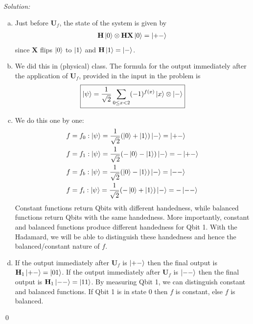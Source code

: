 \documentclass{book}
\theoremstyle{definition}
\newcommand{\nn}{\nonumber}
\newcommand{\X}{\mathbf{X}}
\newcommand{\f}[2]{\frac{#1}{#2}}
\newcommand{\U}{\mathbf{U}}
\newcommand{\had}{\mathbf{H}}
\begin{document}
\noindent \textit{Solution:}

\begin{enumerate}[(a)]
	\item Just before $\U_f$, the state of the system is given by
	\begin{align}
	\had \ket{ 0} \otimes \had \X \ket{0} = \ket{+-}
	\end{align}
	since $\X$ flips $\ket{0}$ to $\ket{1}$ and $\had\ket{1} = \ket{-}$. 
	
	
	\item We did this in (physical) class. The formula for the output immediately after the application of $\U_f$, provided in the input in the problem is  
	\begin{align}
	\boxed{\ket{\psi} = \f{1}{\sqrt{2}}  \sum_{0 \leq x < 2} (-1)^{f(x)}\ket{x} \otimes \ket{-}   }
	\end{align}
	
	
	\item We do this one by one:
	\begin{align}
	&f = f_{0}: \ket{ \psi } = \f{1}{\sqrt{2}} (\ket{0} + \ket{1})  \ket{-} = \ket{+-}\nn\\
	&f = f_{1}: \ket{ \psi } = \f{1}{\sqrt{2}} (-\ket{0} - \ket{1})  \ket{-} = -\ket{+-}\nn\\
	&f = f_{b}: \ket{ \psi } = \f{1}{\sqrt{2}} (\ket{0} - \ket{1})  \ket{-} = \ket{--}\nn\\
	&f = f_{i}: \ket{ \psi } = \f{1}{\sqrt{2}} (-\ket{0} + \ket{1})  \ket{-} = -\ket{--}
	\end{align}
	Constant functions return Qbits with different handedness, while balanced functions return Qbits with the same handedness. More importantly, constant and balanced functions produce different handedness for Qbit 1. With the Hadamard, we will be able to distinguish these handedness and hence the balanced/constant nature of $f$.
	
	
	
	
	\item If the output immediately after $\U_f$ is $\ket{+-}$ then the final output is $\had_1\ket{+-} = \ket{01}$. If the output immediately after $\U_f$ is $\ket{--}$ then the final output is $\had_1\ket{--} = \ket{11}$. By measuring Qbit 1, we can distinguish constant and balanced functions. If Qbit 1 is in state 0 then $f$ is constant, else $f$ is balanced. 
\end{enumerate}


\qed
\end{document}

